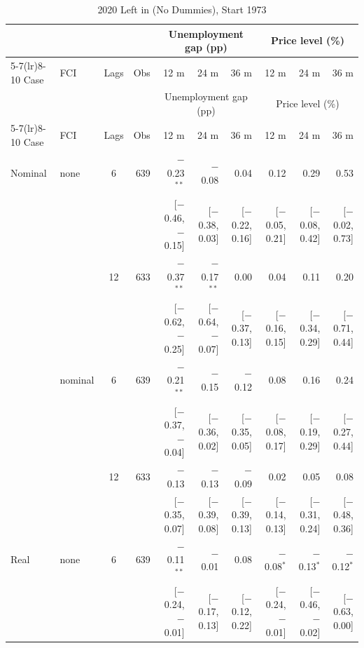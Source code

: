 \begingroup\scriptsize\setlength{\tabcolsep}{0.9pt}
\begin{longtable}{llcrrrrrrr}
\caption{2020 Left in (No Dummies), Start 1973}\label{tab:appR173}\\
\toprule
 & & & & \multicolumn{3}{c}{Unemployment gap (pp)} & \multicolumn{3}{c}{Price level (\%)}\\ \cmidrule(lr){5-7}\cmidrule(lr){8-10}
Case & FCI & Lags & Obs & 12 m & 24 m & 36 m & 12 m & 24 m & 36 m\\
\midrule\endfirsthead
\toprule
 & & & & \multicolumn{3}{c}{Unemployment gap (pp)} & \multicolumn{3}{c}{Price level (\%)}\\ \cmidrule(lr){5-7}\cmidrule(lr){8-10}
Case & FCI & Lags & Obs & 12 m & 24 m & 36 m & 12 m & 24 m & 36 m\\
\midrule\endhead
\bottomrule\endfoot
Nominal & none & 6 & 639 & $-$0.23$^{**}$ & $-$0.08 & 0.04 & 0.12 & 0.29 & 0.53\\
 & & & & {\scriptsize [$-$0.46, $-$0.15]} & {\scriptsize [$-$0.38, 0.03]} & {\scriptsize [$-$0.22, 0.16]} & {\scriptsize [$-$0.05, 0.21]} & {\scriptsize [$-$0.08, 0.42]} & {\scriptsize [$-$0.02, 0.73]}\\
 &  & 12 & 633 & $-$0.37$^{**}$ & $-$0.17$^{**}$ & 0.00 & 0.04 & 0.11 & 0.20\\
 & & & & {\scriptsize [$-$0.62, $-$0.25]} & {\scriptsize [$-$0.64, $-$0.07]} & {\scriptsize [$-$0.37, 0.13]} & {\scriptsize [$-$0.16, 0.15]} & {\scriptsize [$-$0.34, 0.29]} & {\scriptsize [$-$0.71, 0.44]}\\
 & nominal & 6 & 639 & $-$0.21$^{**}$ & $-$0.15 & $-$0.12 & 0.08 & 0.16 & 0.24\\
 & & & & {\scriptsize [$-$0.37, $-$0.04]} & {\scriptsize [$-$0.36, 0.02]} & {\scriptsize [$-$0.35, 0.05]} & {\scriptsize [$-$0.08, 0.17]} & {\scriptsize [$-$0.19, 0.29]} & {\scriptsize [$-$0.27, 0.44]}\\
 &  & 12 & 633 & $-$0.13 & $-$0.13 & $-$0.09 & 0.02 & 0.05 & 0.08\\
 & & & & {\scriptsize [$-$0.35, 0.07]} & {\scriptsize [$-$0.39, 0.08]} & {\scriptsize [$-$0.39, 0.13]} & {\scriptsize [$-$0.14, 0.13]} & {\scriptsize [$-$0.31, 0.24]} & {\scriptsize [$-$0.48, 0.36]}\\
\addlinespace
Real & none & 6 & 639 & $-$0.11$^{**}$ & $-$0.01 & 0.08 & $-$0.08$^{*}$ & $-$0.13$^{*}$ & $-$0.12$^{*}$\\
 & & & & {\scriptsize [$-$0.24, $-$0.01]} & {\scriptsize [$-$0.17, 0.13]} & {\scriptsize [$-$0.12, 0.22]} & {\scriptsize [$-$0.24, $-$0.01]} & {\scriptsize [$-$0.46, $-$0.02]} & {\scriptsize [$-$0.63, 0.00]}\\

\end{longtable}

